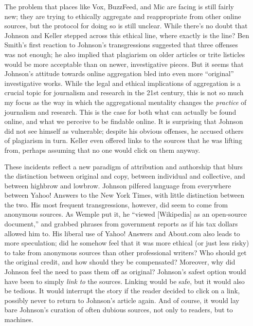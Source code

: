 The problem that places like Vox, BuzzFeed, and Mic are facing is still fairly new; they are trying to ethically aggregate and reappropriate from other online sources, but the protocol for doing so is still unclear. While there's no doubt that Johnson and Keller stepped across this ethical line, where exactly is the line? Ben Smith's first reaction to Johnson's transgressions suggested that three offenses was not enough; he also implied that plagiarism on older articles or trite listicles would be more acceptable than on newer, investigative pieces. But it seems that Johnson's attitude towards online aggregation bled into even more ``original'' investigative works. While the legal and ethical implications of aggregation is a crucial topic for journalism and research in the 21st century, this is not so much my focus as the way in which the aggregational mentality changes the \emph{practice} of journalism and research. This is the case for both what can actually be found online, and what we perceive to be findable online. It is surprising that Johnson did not see himself as vulnerable; despite his obvious offenses, he accused others of plagiarism in turn. Keller even offered links to the sources that he was lifting from, perhaps assuming that no one would click on them anyway.

These incidents reflect a new paradigm of attribution and authorship that blurs the distinction between original and copy, between individual and collective, and between highbrow and lowbrow. Johnson pilfered language from everywhere between Yahoo! Answers to the New York Times, with little distinction between the two. His most frequent transgressions, however, did seem to come from anonymous sources. As Wemple put it, he ``viewed [Wikipedia] as an open-source document,'' and grabbed phrases from government reports as if his tax dollars allowed him to.\autocite{wemple_ravages_2014} His liberal use of Yahoo! Answers and About.com also leads to more speculation; did he somehow feel that it was more ethical (or just less risky) to take from anonymous sources than other professional writers? Who should get the original credit, and how should they be compensated? Moreover, why did Johnson feel the need to pass them off as original? Johnson's safest option would have been to simply \emph{link to} the sources. Linking would be safe, but it would also be tedious. It would interrupt the story if the reader decided to click on a link, possibly never to return to Johnson's article again. And of course, it would lay bare Johnson's curation of often dubious sources, not only to readers, but to machines.

